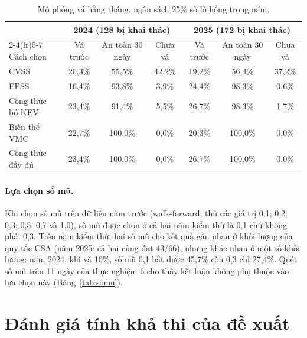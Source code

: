 \documentclass[runningheads]{llncs}
\begin{document}
\begin{table}
\centering
\caption{Mô phỏng vá hằng tháng, ngân sách 25\% số lỗ hổng trong năm.}\label{tab:mophong}
\begin{tabular}{lcccccc}
\toprule
 & \multicolumn{3}{c}{2024 (128 bị khai thác)} & \multicolumn{3}{c}{2025 (172 bị khai thác)} \\
\cmidrule(lr){2-4}\cmidrule(lr){5-7}
Cách chọn & Vá trước & An toàn 30 ngày & Chưa vá & Vá trước & An toàn 30 ngày & Chưa vá \\
\midrule
CVSS                 & 20,3\% & 55,5\%  & 42,2\% & 19,2\% & 56,4\%  & 37,2\% \\
EPSS                 & 16,4\% & 93,8\%  & 3,9\%  & 24,4\% & 98,3\%  & 0,6\% \\
Công thức bỏ KEV     & 23,4\% & 91,4\%  & 5,5\%  & 26,7\% & 98,3\%  & 1,7\% \\
Biến thể VMC         & 22,7\% & 100,0\% & 0,0\%  & 20,3\% & 100,0\% & 0,0\% \\
Công thức đầy đủ     & 23,4\% & 100,0\% & 0,0\%  & 26,7\% & 100,0\% & 0,0\% \\
\bottomrule
\end{tabular}
\end{table}

\paragraph{Lựa chọn số mũ.} Khi chọn số mũ trên dữ liệu năm trước (walk-forward, thử các
giá trị 0,1; 0,2; 0,3; 0,5; 0,7 và 1,0), số mũ được chọn ở cả hai năm kiểm thử là 0,1 chứ
không phải 0,3. Trên năm kiểm thử, hai số mũ cho kết quả gần nhau ở khối lượng của quy tắc CSA
(năm 2025: cả hai cùng đạt 43/66), nhưng khác nhau ở một số khối lượng: năm 2024, khi vá 10\%, số mũ 0,1 bắt
được 45,7\% còn 0,3 chỉ 27,4\%. Quét số mũ trên 11 ngày của thực nghiệm 6 cho thấy kết luận không
phụ thuộc vào lựa chọn này (Bảng~\ref{tab:somu}).

\section{Đánh giá tính khả thi của đề xuất}\label{sec:khathi}
\end{document}

